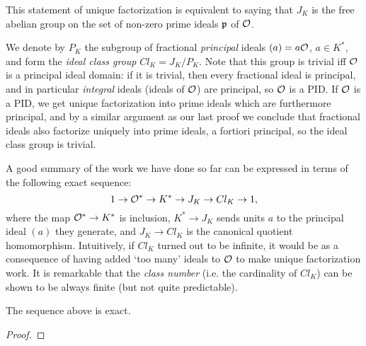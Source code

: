 This statement of unique factorization is equivalent to saying that $J_K$ is the free abelian group on the set of non-zero prime ideals $\mathfrak{p}$ of $\mathcal{O}$.

We denote by $P_K$ the subgroup of fractional \emph{principal} ideals $(a)=a\mathcal{O}$, $a\in K^*$, and form the \emph{ideal class group} $Cl_K=J_K/P_K$. Note that this group is trivial iff $\mathcal{O}$ is a principal ideal domain: if it is trivial, then every fractional ideal is principal, and in particular \emph{integral} ideals (ideals of $\mathcal{O}$) are principal, so $\mathcal{O}$ is a PID. If $\mathcal{O}$ is a PID, we get unique factorization into prime ideals which are furthermore principal, and by a similar argument as our last proof we conclude that fractional ideals also factorize uniquely into prime ideals, a fortiori principal, so the ideal class group is trivial.

A good summary of the work we have done so far can be expressed in terms of the following exact sequence:
\[
	1 \to \mathcal{O}^* \to K^* \to J_K \to Cl_K \to 1,
\]
where the map $\mathcal{O}^*\to K^*$ is inclusion, $K^*\to J_K$ sends units $a$ to the principal ideal $(a)$ they generate, and $J_K\to Cl_K$ is the canonical quotient homomorphism. Intuitively, if $Cl_K$ turned out to be infinite, it would be as a consequence of having added `too many' ideals to $\mathcal{O}$ to make unique factorization work. It is remarkable that the \emph{class number} (i.e. the cardinality of $Cl_K$) can be shown to be always finite (but not quite predictable).

\begin{proposition}
	The sequence above is exact.
\end{proposition}
\begin{proof}
\end{proof}
